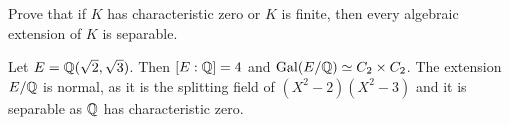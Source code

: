 \begin{exercise}
Prove that if $K$ has characteristic zero or $K$ is finite, then 
every algebraic extension of $K$ is separable. 
\end{exercise}


%



%
%
\begin{example}
    Let $E=\mathbb{Q}(\sqrt{2},\sqrt{3})$. Then 
    $[E:\mathbb{Q}]=4$ and 
    $\operatorname{Gal}(E/\mathbb{Q})\simeq C_2\times C_2$. The extension $E/\mathbb{Q}$ is normal, 
    as it is the splitting field of $(X^2-2)(X^2-3)$ and 
    it is separable as $\mathbb{Q}$ has characteristic zero. 
\end{example}



